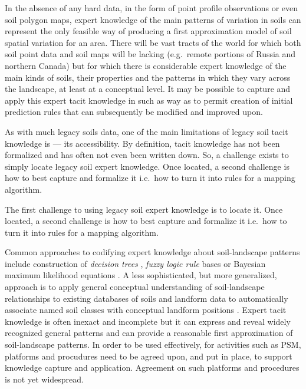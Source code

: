 \documentclass[graybox,natbib,nospthms,UStrade]{svmono}
\let\BeginKnitrBlock\begin \let\EndKnitrBlock\end
\let\BeginKnitrBlock\begin \let\EndKnitrBlock\end
\begin{document}
In the absence of any hard data, in the form of point profile
observations or even soil polygon maps, expert knowledge of the main
patterns of variation in soils can represent the only feasible way of
producing a first approximation model of soil spatial variation for an
area. There will be vast tracts of the world for which both soil point
data and soil maps will be lacking (e.g.~remote portions of Russia and
northern Canada) but for which there is considerable expert knowledge of
the main kinds of soils, their properties and the patterns in which they
vary across the landscape, at least at a conceptual level. It may be
possible to capture and apply this expert tacit knowledge in such as way
as to permit creation of initial prediction rules that can subsequently
be modified and improved upon.

As with much legacy soils data, one of the main limitations of legacy
soil tacit knowledge is --- its accessibility. By definition, tacit
knowledge has not been formalized and has often not even been written
down. So, a challenge exists to simply locate legacy soil expert
knowledge. Once located, a second challenge is how to best capture and
formalize it i.e.~how to turn it into rules for a mapping algorithm.

\BeginKnitrBlock{rmdnote}
The first challenge to using
legacy soil expert knowledge is to locate it. Once located, a second
challenge is how to best capture and formalize it i.e.~how to turn it
into rules for a mapping algorithm.
\EndKnitrBlock{rmdnote}

Common approaches to codifying expert knowledge about soil-landscape
patterns include construction of \emph{decision trees}
\citep{Walter2006DSS, Zhou2004JZUS}, \emph{fuzzy logic rule} bases \citep{Zhu2001} or
Bayesian maximum likelihood equations \citep{Zhou2004JZUS}. A less
sophisticated, but more generalized, approach is to apply general
conceptual understanding of soil-landscape relationships to existing
databases of soils and landform data to automatically associate named
soil classes with conceptual landform positions \citep{MacMillan2005CJSS}.
Expert tacit knowledge is often inexact and incomplete but it can
express and reveal widely recognized general patterns and can provide a
reasonable first approximation of soil-landscape patterns. In order to
be used effectively, for activities such as PSM, platforms and procudures need to be
agreed upon, and put in place, to support knowledge capture and
application. Agreement on such platforms and procedures is not yet
widespread.
\end{document}

